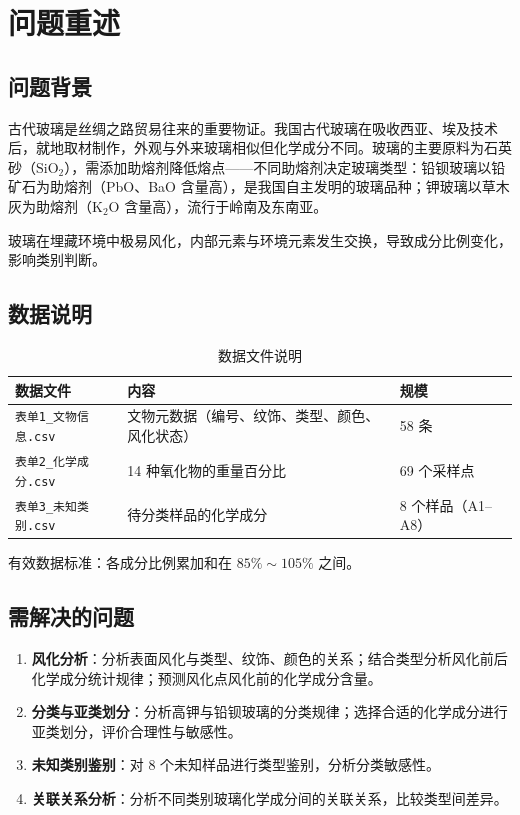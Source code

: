 \section{问题重述}

\subsection{问题背景}

古代玻璃是丝绸之路贸易往来的重要物证。我国古代玻璃在吸收西亚、埃及技术后，就地取材制作，外观与外来玻璃相似但化学成分不同。玻璃的主要原料为石英砂（$\text{SiO}_2$），需添加助熔剂降低熔点——不同助熔剂决定玻璃类型：铅钡玻璃以铅矿石为助熔剂（PbO、BaO 含量高），是我国自主发明的玻璃品种；钾玻璃以草木灰为助熔剂（$\text{K}_2\text{O}$ 含量高），流行于岭南及东南亚。

玻璃在埋藏环境中极易风化，内部元素与环境元素发生交换，导致成分比例变化，影响类别判断。

\subsection{数据说明}

\begin{table}[H]
    \centering
    \caption{数据文件说明}
    \label{tab:data}
    \begin{tabular}{p{5cm} p{5cm} p{4cm}}
        \toprule
        \textbf{数据文件} & \textbf{内容} & \textbf{规模} \\
        \midrule
        \texttt{表单1\_文物信息.csv} & 文物元数据（编号、纹饰、类型、颜色、风化状态） & 58 条 \\
        \texttt{表单2\_化学成分.csv} & 14 种氧化物的重量百分比 & 69 个采样点 \\
        \texttt{表单3\_未知类别.csv} & 待分类样品的化学成分 & 8 个样品（A1--A8） \\
        \bottomrule
    \end{tabular}
\end{table}

有效数据标准：各成分比例累加和在 $85\%\sim105\%$ 之间。

\subsection{需解决的问题}

\begin{enumerate}[label=\arabic*.]
    \item \textbf{风化分析}：分析表面风化与类型、纹饰、颜色的关系；结合类型分析风化前后化学成分统计规律；预测风化点风化前的化学成分含量。
    \item \textbf{分类与亚类划分}：分析高钾与铅钡玻璃的分类规律；选择合适的化学成分进行亚类划分，评价合理性与敏感性。
    \item \textbf{未知类别鉴别}：对 8 个未知样品进行类型鉴别，分析分类敏感性。
    \item \textbf{关联关系分析}：分析不同类别玻璃化学成分间的关联关系，比较类型间差异。
\end{enumerate}
